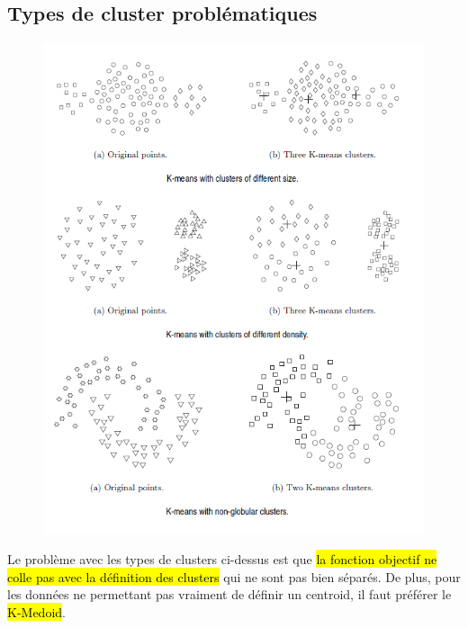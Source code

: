 \documentclass[letterpaper, 12pt]{article}
\begin{document}
		\subsection{Types de cluster problématiques}
			\begin{figure}[H]
				\centering
				\includegraphics[scale=0.85]{Images/k-means_difficulties.png}
				\caption{}
				\label{fig:k-means:difficulties}
			\end{figure}\noindent
			Le problème avec les types de clusters ci-dessus est que 
				\hl{la fonction
				objectif ne colle pas avec la définition des clusters} 
				qui ne sont
				pas bien séparés. De plus, pour les données ne permettant pas
				vraiment de définir un centroid, il faut préférer le 
				\hl{K-Medoid}.
\end{document}
